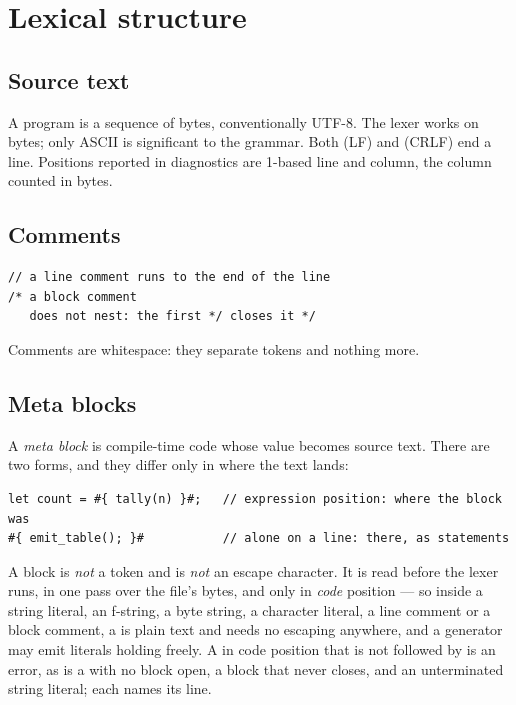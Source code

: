 \section{Lexical structure}
\label{sec:lexical}

\subsection{Source text}

A program is a sequence of bytes, conventionally UTF-8. The lexer works
on bytes; only ASCII is significant to the grammar. Both  (LF) and  (CRLF) end a line. Positions reported
in diagnostics are 1-based line and column, the column counted in bytes.

\subsection{Comments}

\begin{lstlisting}
// a line comment runs to the end of the line
/* a block comment
   does not nest: the first */ closes it */
\end{lstlisting}

\noindent Comments are whitespace: they separate tokens and nothing more.

\subsection{Meta blocks}

A \emph{meta block} is compile-time code whose value becomes source text.
There are two forms, and they differ only in where the text lands:

\begin{lstlisting}
let count = #{ tally(n) }#;   // expression position: where the block was
#{ emit_table(); }#           // alone on a line: there, as statements
\end{lstlisting}

\noindent A block is \emph{not} a token and \ic{\#} is \emph{not} an escape
character. It is read before the lexer runs, in one pass over the file's bytes,
and only in \emph{code} position --- so inside a string literal, an f-string, a
byte string, a character literal, a line comment or a block comment, a
\ic{\#\{} is plain text and needs no escaping anywhere, and a generator may
emit literals holding \ic{\#\{} freely. A \ic{\#} in code position that is not
followed by \ic{\{} is an error, as is a \ic{\}\#} with no block open, a block
that never closes, and an unterminated string literal; each names its line.

